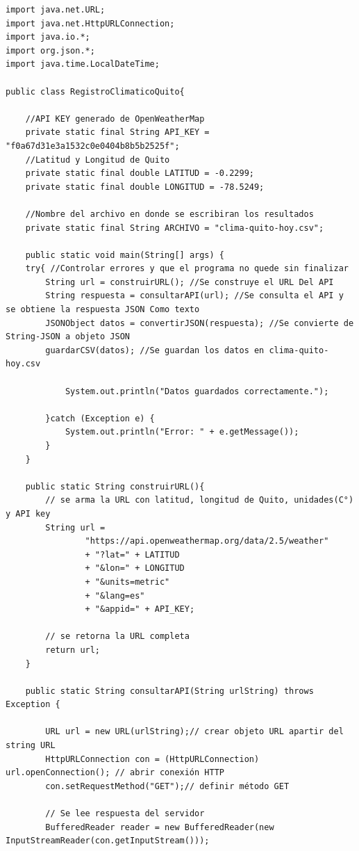 \documentclass{article}
\begin{document}
\begin{verbatim}
import java.net.URL;
import java.net.HttpURLConnection;
import java.io.*;
import org.json.*;
import java.time.LocalDateTime;

public class RegistroClimaticoQuito{

    //API KEY generado de OpenWeatherMap
    private static final String API_KEY = "f0a67d31e3a1532c0e0404b8b5b2525f";
    //Latitud y Longitud de Quito
    private static final double LATITUD = -0.2299;
    private static final double LONGITUD = -78.5249;

    //Nombre del archivo en donde se escribiran los resultados
    private static final String ARCHIVO = "clima-quito-hoy.csv";

    public static void main(String[] args) {
	try{ //Controlar errores y que el programa no quede sin finalizar
	    String url = construirURL(); //Se construye el URL Del API
	    String respuesta = consultarAPI(url); //Se consulta el API y se obtiene la respuesta JSON Como texto
	    JSONObject datos = convertirJSON(respuesta); //Se convierte de String-JSON a objeto JSON
	    guardarCSV(datos); //Se guardan los datos en clima-quito-hoy.csv

            System.out.println("Datos guardados correctamente.");

        }catch (Exception e) {
            System.out.println("Error: " + e.getMessage());
        }
    }

    public static String construirURL(){
        // se arma la URL con latitud, longitud de Quito, unidades(C°) y API key
        String url =
                "https://api.openweathermap.org/data/2.5/weather"
                + "?lat=" + LATITUD
                + "&lon=" + LONGITUD
                + "&units=metric"
                + "&lang=es"
                + "&appid=" + API_KEY;

        // se retorna la URL completa
        return url;
    }

    public static String consultarAPI(String urlString) throws Exception {

        URL url = new URL(urlString);// crear objeto URL apartir del string URL
        HttpURLConnection con = (HttpURLConnection) url.openConnection(); // abrir conexión HTTP
        con.setRequestMethod("GET");// definir método GET
	
        // Se lee respuesta del servidor
        BufferedReader reader = new BufferedReader(new InputStreamReader(con.getInputStream()));


\end{verbatim}
\end{document}
